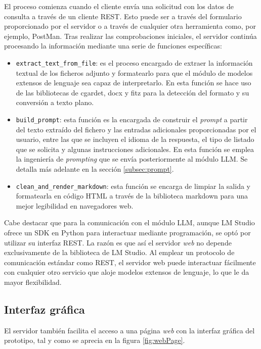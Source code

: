 El proceso comienza cuando el cliente envía una solicitud con los datos de consulta a través de un cliente REST.
Esto puede ser a través del formulario proporcionado por el servidor o a través de cualquier otra herramienta como,
por ejemplo, PostMan.
Tras realizar las comprobaciones iniciales,
el servidor continúa procesando la información mediante una serie de funciones específicas:
\begin{itemize}
\item \texttt{extract\_text\_from\_file}:
es el proceso encargado de extraer la información textual de los ficheros adjunto
y formatearlo para que el módulo de modelos extensos de lenguaje sea capaz de interpretarlo.
En esta función se hace uso de las bibliotecas de cgardet, docx y fitz para la detección del formato y
su conversión a texto plano.
\item \texttt{build\_prompt}:
esta función es la encargada de construir el \textit{prompt} a partir del texto extraído del fichero
y las entradas adicionales proporcionadas por el usuario, entre las que se incluyen el idioma de
la respuesta, el tipo de listado que se solicita y algunas instrucciones adicionales.
En esta función se emplea la ingeniería de \textit{prompting} que se envía posteriormente al módulo LLM.
Se detalla más adelante en la sección \ref{subsec:prompt}.
\item \texttt{clean\_and\_render\_markdown}:
esta función se encarga de limpiar la salida y formatearla en código HTML
a través de la biblioteca markdown para una mejor legibilidad en navegadores web.
\end{itemize}

Cabe destacar que para la comunicación con el módulo LLM,
aunque LM Studio ofrece un SDK en Python para interactuar mediante programación,
se optó por utilizar su interfaz REST.
La razón es que así el servidor \textit{web} no depende exclusivamente de la biblioteca de LM Studio.
Al emplear un protocolo de comunicación estándar como REST,
el servidor web puede interactuar fácilmente con cualquier otro servicio que aloje modelos extensos de lenguaje,
lo que le da mayor flexibilidad.

\subsection{Interfaz gráfica}
El servidor también facilita el acceso a una página \textit{web} con la interfaz gráfica del prototipo,
tal y como se aprecia en la figura \ref{fig:webPage}.

